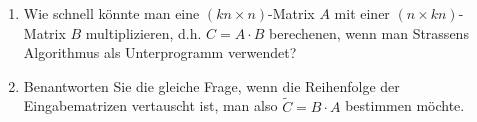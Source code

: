 
\begin{exercise}

\begin{enumerate}[label = (\alph*)]
  \item Wie schnell könnte man eine $(kn \times n)$-Matrix $A$ mit einer $(n \times kn)$-Matrix $B$ multiplizieren, d.h. $C = A \cdot B$ berechenen, wenn man Strassens Algorithmus als Unterprogramm verwendet?
  \item Benantworten Sie die gleiche Frage, wenn die Reihenfolge der Eingabematrizen vertauscht ist, man also $\tilde{C} = B \cdot A$ bestimmen möchte.
\end{enumerate}

\end{exercise}


